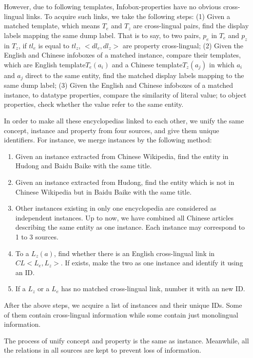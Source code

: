 \documentclass[runningheads,a4paper]{llncs}
\begin{document}
However, due to following templates, Infobox-properties have no obvious cross-lingual links. To acquire such links, we take the following steps: (1) Given a matched template, which means $T_{e}$ and $T_{z}$ are cross-lingual pairs, find the display labels mapping the same dump label. That is to say, to two pairs, $p_{e}$ in $T_{e}$ and $p_{z}$ in $T_{z}$, if $tl_{e}$ is equal to $tl_{z}$, $<dl_{e},dl_{z}>$ are property cross-lingual; (2) Given the English and Chinese infoboxes of a matched instance, compare their templates, which are English template$T_{e}(a_{i})$ and a Chinese template$T_{z}(a_{j})$ in which $a_{i}$ and $a_{j}$ direct to the same entity, find the matched display labels mapping to the same dump label; (3) Given the English and Chinese infoboxes of a matched instance, to datatype properties, compare the similarity of literal value; to object properties, check whether the value refer to the same entity. 

In order to make all these encyclopedias linked to each other, we unify the same concept, instance and property from four sources, and give them unique identifiers. For instance, we merge instances by the following method:

\begin{enumerate}[Step 1]
    \item Given an instance extracted from Chinese Wikipedia, find the entity in Hudong and Baidu Baike with the same title.
    \item Given an instance extracted from Hudong, find the entity which is not in Chinese Wikipedia but in Baidu Baike with the same title.
    \item Other instances existing in only one encyclopedia are considered as independent instances. Up to now, we have combined all Chinese articles describing the same entity as one instance. Each instance may correspond to 1 to 3 sources.
    \item To a $L_{z}(a)$, find whether there is an English cross-lingual link in $CL<L_{e}, L_{z}>$. If exists, make the two as one instance and identify it using an ID.
    \item If a $L_{z}$ or a $L_{e}$ has no matched cross-lingual link, number it with an new ID.
\end{enumerate}

After the above steps, we acquire a list of instances and their unique IDs. Some of them contain cross-lingual information while some contain just monolingual information.

The process of unify concept and property is the same as instance. Meanwhile, all the relations in all sources are kept to prevent loss of information.
\end{document}
